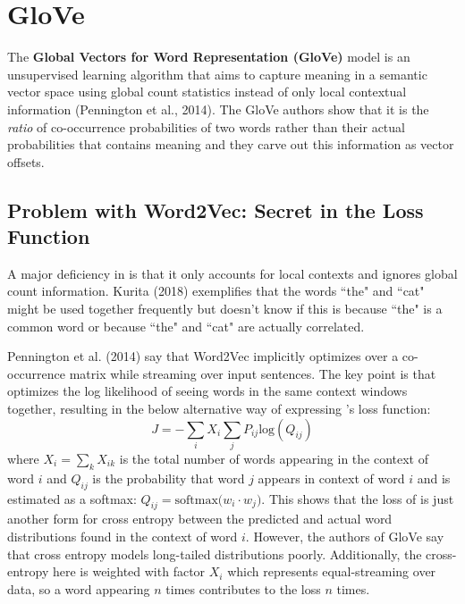 \section{GloVe} \label{sec:Glove}

The \textbf{Global Vectors for Word Representation (GloVe)} model is an unsupervised learning algorithm that aims to capture meaning in a semantic vector space using global count statistics instead of only local contextual information (Pennington et al., 2014). The GloVe authors show that it is the \emph{ratio} of co-occurrence probabilities of two words rather than their actual probabilities that contains meaning and they carve out this information as vector offsets. 

\subsection{Problem with Word2Vec: Secret in the Loss Function} \label{sec:ProblemWord2VecFromGloveStandpoint}

A major deficiency in  is that it only accounts for local contexts and ignores global count information. Kurita (2018) exemplifies that the words ``the" and ``cat" might be used together frequently but  doesn't know if this is because ``the" is a common word or because ``the" and ``cat" are actually correlated. \newline

Pennington et al. (2014) say that Word2Vec implicitly optimizes over a co-occurrence matrix while streaming over input sentences. The key point is that  optimizes the log likelihood of seeing words in the same context windows together, resulting in the below alternative way of expressing 's loss function: 
$$
J = - \sum_i X_i \sum_j P_{ij} \text{log}(Q_{ij}) 
$$
where $X_i = \sum_k X_{ik}$ is the total number of words appearing in the context of word $i$ and $Q_{ij}$ is the probability that word $j$ appears in context of word $i$ and is estimated as a softmax: $Q_{ij} = \text{softmax} \Big( w_i \cdot w_j \Big)$. This shows that the loss of  is just another form for cross entropy between the predicted and actual word distributions found in the context of word $i$. However, the authors of GloVe say that cross entropy models long-tailed distributions poorly. Additionally, the cross-entropy here is weighted with factor $X_i$ which represents equal-streaming over data, so a word appearing $n$ times contributes to the loss $n$ times. \newline 

